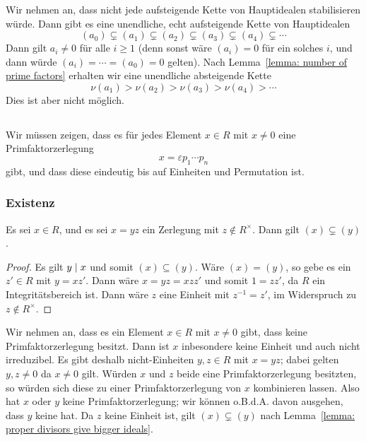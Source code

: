 \subsubsection{}

Wir nehmen an, dass nicht jede aufsteigende Kette von Hauptidealen stabilisieren würde.
Dann gibt es eine unendliche, echt aufsteigende Kette von Hauptidealen
\[
              (a_0)
  \subsetneq  (a_1)
  \subsetneq  (a_2)
  \subsetneq  (a_3)
  \subsetneq  (a_4)
  \subsetneq  \dotsb
\]
Dann gilt $a_i \neq 0$ für alle $i \geq 1$ (denn sonst wäre $(a_i) = 0$ für ein solches $i$, und dann würde $(a_i) = \dotsb = (a_0) = 0$ gelten).
Nach Lemma~\ref{lemma: number of prime factors} erhalten wir eine unendliche absteigende Kette
\[
    \nu(a_1)
  > \nu(a_2)
  > \nu(a_3)
  > \nu(a_4)
  > \dotsb
\]
Dies ist aber nicht möglich.





\subsection{}

Wir müssen zeigen, dass es für jedes Element $x \in R$ mit $x \neq 0$ eine Primfaktorzerlegung
\[
  x = \varepsilon p_1 \dotsm p_n
\]
gibt, und dass diese eindeutig bis auf Einheiten und Permutation ist.

\subsubsection*{Existenz}

\begin{lemma}
  \label{lemma: proper divisors give bigger ideals}
  Es sei $x \in R$, und es sei $x = yz$ ein Zerlegung mit $z \notin R^\times$.
  Dann gilt $(x) \subsetneq (y)$.
\end{lemma}

\begin{proof}
  Es gilt $y \mathrel{|} x$ und somit $(x) \subseteq (y)$.
  Wäre $(x) = (y)$, so gebe es ein $z' \in R$ mit $y = xz'$.
  Dann wäre $x = yz = xzz'$ und somit $1 = zz'$, da $R$ ein Integritätsbereich ist.
  Dann wäre $z$ eine Einheit mit $z^{-1} = z'$, im Widerspruch zu $z \notin R^\times$.
\end{proof}

Wir nehmen an, dass es ein Element $x \in R$ mit $x \neq 0$ gibt, dass keine Primfaktorzerlegung besitzt.
Dann ist $x$ inbesondere keine Einheit und auch nicht irreduzibel.
Es gibt deshalb nicht-Einheiten $y, z \in R$ mit $x = y z$;
dabei gelten $y, z \neq 0$ da $x \neq 0$ gilt.
Würden $x$ und $z$ beide eine Primfaktorzerlegung besitzten, so würden sich diese zu einer Primfaktorzerlegung von $x$ kombinieren lassen.
Also hat $x$ oder $y$ keine Primfaktorzerlegung;
wir können o.B.d.A. davon ausgehen, dass $y$ keine hat.
Da $z$ keine Einheit ist, gilt $(x) \subsetneq (y)$ nach Lemma~\ref{lemma: proper divisors give bigger ideals}.

